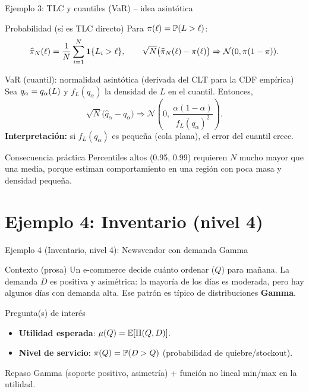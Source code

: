 \documentclass[aspectratio=1610, 9pt]{beamer}
\begin{document}
\begin{frame}{Ejemplo 3: TLC y cuantiles (VaR) -- idea asintótica}
\small
\begin{block}{Probabilidad (sí es TLC directo)}
Para $\pi(\ell)=\mathbb{P}(L>\ell)$:
\[
\widehat{\pi}_N(\ell)=\frac{1}{N}\sum_{i=1}^N \mathbf{1}\{L_i>\ell\},
\qquad
\sqrt{N}\big(\widehat{\pi}_N(\ell)-\pi(\ell)\big)\Rightarrow \mathcal{N}(0,\pi(1-\pi)).
\]
\end{block}

\begin{block}{VaR (cuantil): normalidad asintótica (derivada del CLT para la CDF empírica)}
Sea $q_\alpha=q_\alpha(L)$ y $f_L(q_\alpha)$ la densidad de $L$ en el cuantil. Entonces,
\[
\sqrt{N}\big(\widehat{q}_\alpha-q_\alpha\big)\Rightarrow
\mathcal{N}\!\left(0,\ \frac{\alpha(1-\alpha)}{f_L(q_\alpha)^2}\right).
\]
\textbf{Interpretación:} si $f_L(q_\alpha)$ es pequeña (cola plana), el error del cuantil crece.
\end{block}

\begin{alertblock}{Consecuencia práctica}
Percentiles altos (0.95, 0.99) requieren $N$ mucho mayor que una media,
porque estiman comportamiento en una región con poca masa y densidad pequeña.
\end{alertblock}
\end{frame}

\section*{Ejemplo 4: Inventario (nivel 4)}

\begin{frame}{Ejemplo 4 (Inventario, nivel 4): Newsvendor con demanda Gamma}
\small
\begin{block}{Contexto (prosa)}
Un e-commerce decide cuánto ordenar ($Q$) para mañana. La demanda $D$ es positiva y asimétrica:
la mayoría de los días es moderada, pero hay algunos días con demanda alta.
Ese patrón es típico de distribuciones \textbf{Gamma}.
\end{block}

\begin{block}{Pregunta(s) de interés}
\begin{itemize}
\item \textbf{Utilidad esperada}: $\mu(Q)=\mathbb{E}[\Pi(Q,D)]$.
\item \textbf{Nivel de servicio}: $\pi(Q)=\mathbb{P}(D>Q)$ (probabilidad de quiebre/stockout).
\end{itemize}
\end{block}

\begin{alertblock}{Repaso}
Gamma (soporte positivo, asimetría) + función no lineal min/max en la utilidad.
\end{alertblock}
\end{frame}
\end{document}
